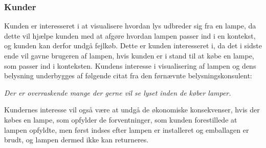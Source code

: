 \subsubsection{Kunder}
Kunden er interesseret i at visualisere hvordan lys udbreder sig fra en lampe, da dette vil hjælpe kunden med at afgøre hvordan lampen passer ind i en kontekst, og kunden kan derfor undgå fejlkøb. Dette er kunden interesseret i, da det i sidste ende vil gavne brugeren af lampen, hvis kunden er i stand til at købe en lampe, som passer ind i konteksten. Kundens interesse i visualisering af lampen og dens belysning underbygges af følgende citat fra den førnævnte belysningskonsulent:
\begin{center}
\textit{Der er overraskende mange der gerne vil se lyset inden de køber lamper.}
\end{center}

Kundernes interesse vil også være at undgå de økonomiske konsekvenser, hvis der købes en lampe, som opfylder de forventninger, som kunden forestillede at lampen opfyldte, men først indses efter lampen er installeret og emballagen er brudt, og lampen dermed ikke kan returneres.